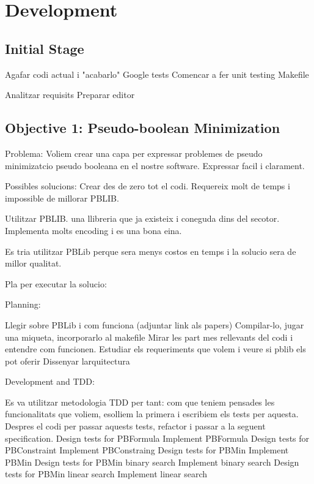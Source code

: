 \chapter{Development} 
\label{Chapter3}

\section{Initial Stage} %

Agafar codi actual i "acabarlo"
Google tests
Comencar a fer unit testing
Makefile

Analitzar requisits
Preparar editor


\section{Objective 1: Pseudo-boolean Minimization}

Problema:
Voliem crear una capa per expressar problemes de pseudo minimizatcio pseudo booleana en el nostre software. 
Expressar facil i clarament.

Possibles solucions:
Crear des de zero tot el codi. Requereix molt de temps i impossible de millorar PBLIB.

Utilitzar PBLIB. una llibreria que ja existeix i coneguda dins del secotor. Implementa molts encoding i es una bona eina.

Es tria utilitzar PBLib perque sera menys costos en temps i la solucio sera de millor qualitat.

Pla per executar la solucio:

Planning:

Llegir sobre PBLib i com funciona (adjuntar link als papers)
Compilar-lo, jugar una miqueta, incorporarlo al makefile
Mirar les part mes rellevants del codi i entendre com funcionen.
Estudiar els requeriments que volem i veure si pblib els pot oferir
Dissenyar larquitectura

Development and TDD:

Es va utilitzar metodologia TDD per tant:
com que teniem pensades les funcionalitats que voliem, esolliem la primera i escribiem els tests per aquesta. Despres el codi per passar aquests tests, refactor i passar a la seguent specification.
Design tests for PBFormula
Implement PBFormula
Design tests for PBConstraint
Implement PBConstraing
Design tests for PBMin
Implement PBMin
Design tests for PBMin binary search
Implement binary search
Design tests for PBMin linear search
Implement linear search

